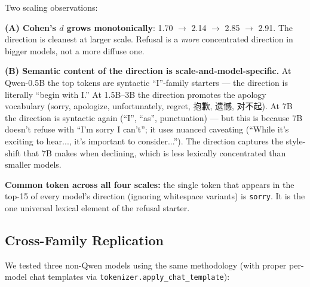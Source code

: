\documentclass[11pt,a4paper]{article}
\begin{document}
Two scaling observations:

\textbf{(A) Cohen's $d$ grows monotonically}: 1.70 $\to$ 2.14 $\to$ 2.85 $\to$ 2.91. The direction is cleanest at larger scale. Refusal is a \emph{more} concentrated direction in bigger models, not a more diffuse one.

\textbf{(B) Semantic content of the direction is scale-and-model-specific.} At Qwen-0.5B the top tokens are syntactic ``I''-family starters --- the direction is literally ``begin with I.'' At 1.5B--3B the direction promotes the apology vocabulary (sorry, apologize, unfortunately, regret, 抱歉, 遗憾, 对不起). At 7B the direction is syntactic again (``I'', ``as'', punctuation) --- but this is because 7B doesn't refuse with ``I'm sorry I can't''; it uses nuanced caveating (``While it's exciting to hear..., it's important to consider...''). The direction captures the style-shift that 7B makes when declining, which is less lexically concentrated than smaller models.

\textbf{Common token across all four scales:} the single token that appears in the top-15 of every model's direction (ignoring whitespace variants) is \texttt{sorry}. It is the one universal lexical element of the refusal starter.

\subsection{Cross-Family Replication}

We tested three non-Qwen models using the same methodology (with proper per-model chat templates via \texttt{tokenizer.apply\_chat\_template}):
\end{document}
